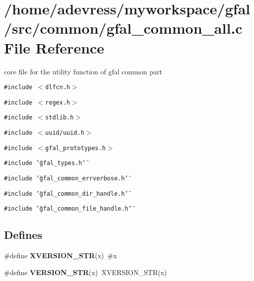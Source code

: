 \section{/home/adevress/myworkspace/gfal/src/common/gfal\_\-common\_\-all.c File Reference}
\label{gfal__common__all_8c}
core file for the utility function of gfal common part 

{\tt \#include $<$dlfcn.h$>$}\par
{\tt \#include $<$regex.h$>$}\par
{\tt \#include $<$stdlib.h$>$}\par
{\tt \#include $<$uuid/uuid.h$>$}\par
{\tt \#include $<$gfal\_\-prototypes.h$>$}\par
{\tt \#include \char`\"{}gfal\_\-types.h\char`\"{}}\par
{\tt \#include \char`\"{}gfal\_\-common\_\-errverbose.h\char`\"{}}\par
{\tt \#include \char`\"{}gfal\_\-common\_\-dir\_\-handle.h\char`\"{}}\par
{\tt \#include \char`\"{}gfal\_\-common\_\-file\_\-handle.h\char`\"{}}\par
\subsection*{Defines}
\begin{CompactItemize}
\item 
\#define \textbf{XVERSION\_\-STR}(x)~\#x\label{gfal__common__all_8c_09fc3dfb86b46f489c9bf89b784a285a}

\item 
\#define \textbf{VERSION\_\-STR}(x)~XVERSION\_\-STR(x)\label{gfal__common__all_8c_86cff2cb94b4b7cbf259ff9859c0dc50}

\end{CompactItemize}
